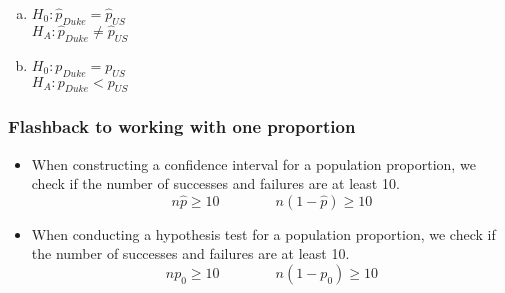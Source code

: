 \documentclass[slidestop,compress,mathserif]{beamer}
\newcommand{\soln}[1]{\textit{#1}}
\begin{document}
\begin{frame}


\begin{enumerate}[(a)]
\item $H_0:  \hat{p}_{Duke} = \hat{p}_{US}$ \\
$H_A:  \hat{p}_{Duke} \ne \hat{p}_{US}$
\item $H_0:  p_{Duke} = p_{US}$ \\
$H_A:  p_{Duke} < p_{US}$
\end{enumerate}

\soln{
}

\end{frame}


\begin{frame}
\frametitle{Flashback to working with one proportion}

\begin{itemize}

\item When constructing a confidence interval for a population proportion, we check if the  number of successes and failures are at least 10.
\[ n\hat{p} \ge 10 \qquad \qquad n(1-\hat{p}) \ge 10 \]

\pause

\item When conducting a hypothesis test for a population proportion, we check if the  number of successes and failures are at least 10.
\[ np_0 \ge 10 \qquad \qquad n(1-p_0) \ge 10 \]

\end{itemize}

\end{frame}

\end{document}
